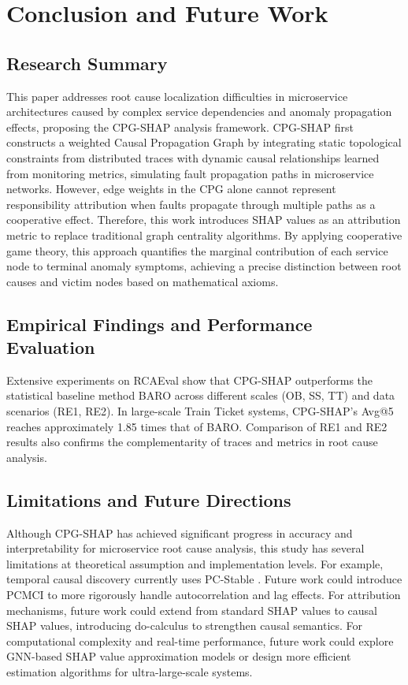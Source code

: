 \documentclass[conference]{IEEEtran}
\begin{document}
\section{Conclusion and Future Work}

\subsection{Research Summary}

This paper addresses root cause localization difficulties in microservice architectures caused by complex service dependencies and anomaly propagation effects, proposing the CPG-SHAP analysis framework. CPG-SHAP first constructs a weighted Causal Propagation Graph by integrating static topological constraints from distributed traces with dynamic causal relationships learned from monitoring metrics, simulating fault propagation paths in microservice networks. However, edge weights in the CPG alone cannot represent responsibility attribution when faults propagate through multiple paths as a cooperative effect. Therefore, this work introduces SHAP values as an attribution metric to replace traditional graph centrality algorithms. By applying cooperative game theory, this approach quantifies the marginal contribution of each service node to terminal anomaly symptoms, achieving a precise distinction between root causes and victim nodes based on mathematical axioms.

\subsection{Empirical Findings and Performance Evaluation}

Extensive experiments on RCAEval show that CPG-SHAP outperforms the statistical baseline method BARO across different scales (OB, SS, TT) and data scenarios (RE1, RE2). In large-scale Train Ticket systems, CPG-SHAP's Avg@5 reaches approximately 1.85 times that of BARO. Comparison of RE1 and RE2 results also confirms the complementarity of traces and metrics in root cause analysis.

\subsection{Limitations and Future Directions}

Although CPG-SHAP has achieved significant progress in accuracy and interpretability for microservice root cause analysis, this study has several limitations at theoretical assumption and implementation levels. For example, temporal causal discovery currently uses PC-Stable \cite{pcstable}. Future work could introduce PCMCI to more rigorously handle autocorrelation and lag effects. For attribution mechanisms, future work could extend from standard SHAP values \cite{shapley} to causal SHAP values, introducing do-calculus to strengthen causal semantics. For computational complexity and real-time performance, future work could explore GNN-based SHAP value approximation models or design more efficient estimation algorithms for ultra-large-scale systems.
\end{document}
